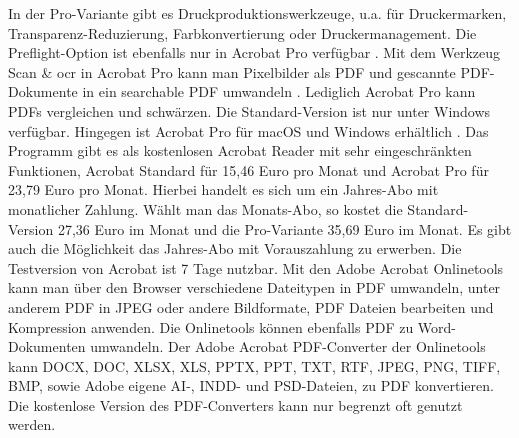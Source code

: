 In der Pro-Variante gibt es Druckproduktionswerkzeuge, u.a. für Druckermarken, Transparenz-Reduzierung, Farbkonvertierung oder Druckermanagement. Die Preflight-Option ist ebenfalls nur in Acrobat Pro verfügbar \cite{adobe-acrobat-um}. Mit dem Werkzeug Scan \& \gls{ocr} in Acrobat Pro kann man Pixelbilder als PDF und gescannte PDF-Dokumente in ein searchable PDF umwandeln \cite{adobe-search}. Lediglich Acrobat Pro kann PDFs vergleichen und schwärzen. Die Standard-Version ist nur unter Windows verfügbar. Hingegen ist Acrobat Pro für macOS und Windows erhältlich \cite{wondershare-acrobat}. Das Programm gibt es als kostenlosen Acrobat Reader mit sehr eingeschränkten Funktionen, Acrobat Standard für 15,46 Euro pro Monat und Acrobat Pro für 23,79 Euro pro Monat. Hierbei handelt es sich um ein Jahres-Abo mit monatlicher Zahlung. Wählt man das Monats-Abo, so kostet die Standard-Version 27,36 Euro im Monat und die Pro-Variante 35,69 Euro im Monat. Es gibt auch die Möglichkeit das Jahres-Abo mit Vorauszahlung zu erwerben. Die Testversion von Acrobat ist 7 Tage nutzbar. Mit den Adobe Acrobat Onlinetools kann man über den Browser verschiedene Dateitypen in PDF umwandeln, unter anderem PDF in JPEG oder andere Bildformate, PDF Dateien bearbeiten und Kompression anwenden. Die Onlinetools können ebenfalls PDF zu Word-Dokumenten umwandeln. \cite{adobe-search} Der Adobe Acrobat PDF-Converter der Onlinetools kann DOCX, DOC, XLSX, XLS, PPTX, PPT, TXT, RTF, JPEG, PNG, TIFF, BMP, sowie Adobe eigene AI-, INDD- und PSD-Dateien, zu PDF konvertieren. \cite{adobe-formate} Die kostenlose Version des PDF-Converters kann nur begrenzt oft genutzt werden.


